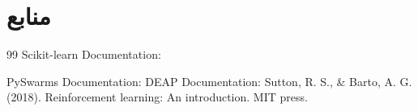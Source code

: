 \documentclass{article}
\begin{document}

\section*{منابع}

\renewcommand{\section}[2]{}%
\begin{thebibliography}{99}
 Scikit-learn Documentation: \href{https://scikit-learn.org/}{}
\begin{LTRitems}
\resetlatinfont
{} PySwarms Documentation: \href{https://pyswarms.readthedocs.io/}{}
 DEAP Documentation: \href{https://deap.readthedocs.io/}{}
 Sutton, R. S., \& Barto, A. G. (2018). Reinforcement learning: An introduction. MIT press.
\end{LTRitems}

\end{thebibliography}
\end{document}
